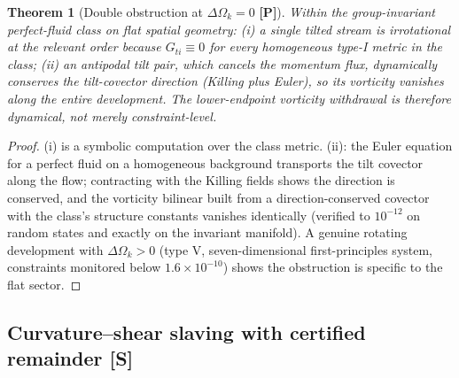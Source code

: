 \documentclass[10pt]{article}
\newtheorem{theorem}{Theorem}[section]
\theoremstyle{definition}
\newcommand{\tier}[1]{\textbf{[#1]}}
\newcommand{\dOk}{\Delta\Omega_{k}}
\begin{document}
\begin{theorem}[Double obstruction at $\dOk = 0$ \tier{P}]
\label{thm:dok}
Within the group-invariant perfect-fluid class on flat spatial
geometry: (i) a single tilted stream is irrotational at the relevant
order because $G_{ti} \equiv 0$ for every homogeneous type-I metric in
the class; (ii) an antipodal tilt pair, which cancels the momentum
flux, dynamically conserves the tilt-covector direction (Killing plus
Euler), so its vorticity vanishes along the entire development. The
lower-endpoint vorticity withdrawal is therefore dynamical, not merely
constraint-level.
\end{theorem}
\begin{proof}
(i) is a symbolic computation over the class metric. (ii): the Euler
equation for a perfect fluid on a homogeneous background transports
the tilt covector along the flow; contracting with the Killing fields
shows the direction is conserved, and the vorticity bilinear built
from a direction-conserved covector with the class's structure
constants vanishes identically (verified to $10^{-12}$ on random
states and exactly on the invariant manifold). A genuine rotating
development with $\dOk > 0$ (type V, seven-dimensional first-principles
system, constraints monitored below $1.6\times10^{-10}$) shows the
obstruction is specific to the flat sector.
\end{proof}

\subsection{Curvature--shear slaving with certified remainder \tier{S}}
\label{sec:omk}
\end{document}
